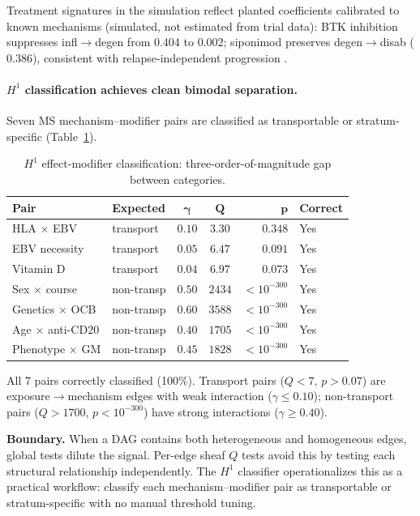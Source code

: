 \documentclass{article}
\begin{document}
Treatment signatures in the simulation reflect planted coefficients calibrated to known mechanisms (simulated, not estimated from trial data): BTK inhibition suppresses infl$\to$degen from $0.404$ to $0.002$; siponimod preserves degen$\to$disab ($0.386$), consistent with relapse-independent progression \citep{kappos2018siponimod}.

\paragraph{$H^1$ classification achieves clean bimodal separation.}
Seven MS mechanism--modifier pairs are classified as transportable or stratum-specific (Table~\ref{tab:h1}).

\begin{table}[t]
\centering
\caption{$H^1$ effect-modifier classification: three-order-of-magnitude gap between categories.}
\label{tab:h1}
\small
\begin{tabular}{@{}llccrl@{}}
\toprule
\textbf{Pair} & \textbf{Expected} & $\boldsymbol{\gamma}$ & $\boldsymbol{Q}$ & $\boldsymbol{p}$ & \textbf{Correct} \\
\midrule
HLA $\times$ EBV & transport & $0.10$ & $3.30$ & $0.348$ & Yes \\
EBV necessity & transport & $0.05$ & $6.47$ & $0.091$ & Yes \\
Vitamin D & transport & $0.04$ & $6.97$ & $0.073$ & Yes \\
\midrule
Sex $\times$ course & non-transp & $0.50$ & $2434$ & $< 10^{-300}$ & Yes \\
Genetics $\times$ OCB & non-transp & $0.60$ & $3588$ & $< 10^{-300}$ & Yes \\
Age $\times$ anti-CD20 & non-transp & $0.40$ & $1705$ & $< 10^{-300}$ & Yes \\
Phenotype $\times$ GM & non-transp & $0.45$ & $1828$ & $< 10^{-300}$ & Yes \\
\bottomrule
\end{tabular}
\end{table}

All 7 pairs correctly classified (100\%).
Transport pairs ($Q < 7$, $p > 0.07$) are exposure$\to$mechanism edges with weak interaction ($\gamma \leq 0.10$); non-transport pairs ($Q > 1700$, $p < 10^{-300}$) have strong interactions ($\gamma \geq 0.40$).

\textbf{Boundary.} When a DAG contains both heterogeneous and homogeneous edges, global tests dilute the signal.
Per-edge sheaf $Q$ tests avoid this by testing each structural relationship independently.
The $H^1$ classifier operationalizes this as a practical workflow: classify each mechanism--modifier pair as transportable or stratum-specific with no manual threshold tuning.
\end{document}
